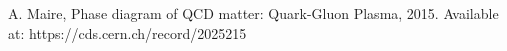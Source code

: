 A. Maire, Phase diagram of QCD matter: Quark-Gluon Plasma, 2015. Available at: https://cds.cern.ch/record/2025215
